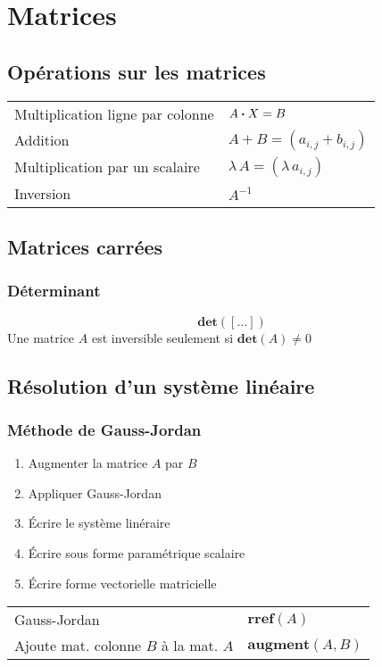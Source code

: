 \section{Matrices}
\subsection{Opérations sur les matrices}
\begin{tabular}{ll}
    Multiplication ligne par colonne & \(A\vdot X = B\) \\
    Addition & $A+B= (a_{i,j}+ b_{i,j})$\\
    Multiplication par un scalaire & $ \lambda \,A = (\lambda\, a_{i,j})$\\
    Inversion & $A^{-1}$
\end{tabular}

\subsection{Matrices carrées}
\subsubsection{Déterminant}
\[\mathbf{det}([\dots])\]
Une matrice $A$ est inversible seulement si $\mathbf{det}(A)\neq 0$

\subsection{Résolution d'un système linéaire}

\subsubsection{Méthode de Gauss-Jordan}
\begin{enumerate}[nosep]
    \item Augmenter la matrice $A$ par $B$
    \item Appliquer Gauss-Jordan
    \item Écrire le système linéraire
    \item Écrire sous forme paramétrique scalaire
    \item Écrire forme vectorielle matricielle
\end{enumerate}
\begin{tabular}{ll}
    Gauss-Jordan & $\mathbf{rref}(A)$ \\ 
    Ajoute mat. colonne $B$ à la mat. $A$ & $\mathbf{augment}(A,B) $ 
\end{tabular}

